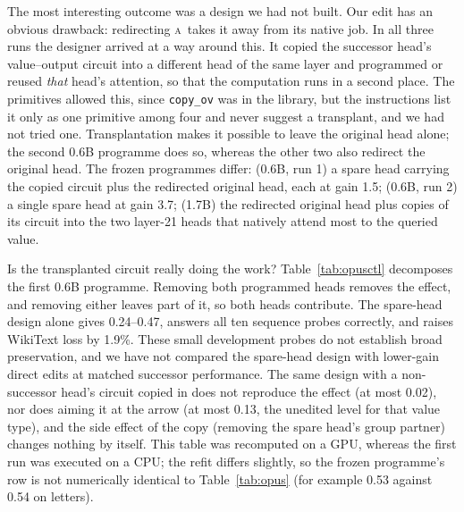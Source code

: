 \documentclass[11pt]{article}
\newcommand{\A}{\textsc{a}}
\begin{document}
The most interesting outcome was a design we had not built. Our edit has an obvious drawback: redirecting \A\ takes it away from its native job. In all three runs the designer arrived at a way around this. It copied the successor head's value--output circuit into a different head of the same layer and programmed or reused \emph{that} head's attention, so that the computation runs in a second place. The primitives allowed this, since \texttt{copy\_ov} was in the library, but the instructions list it only as one primitive among four and never suggest a transplant, and we had not tried one. Transplantation makes it possible to leave the original head alone; the second 0.6B programme does so, whereas the other two also redirect the original head. The frozen programmes differ: (0.6B, run 1) a spare head carrying the copied circuit plus the redirected original head, each at gain 1.5; (0.6B, run 2) a single spare head at gain 3.7; (1.7B) the redirected original head plus copies of its circuit into the two layer-21 heads that natively attend most to the queried value.

Is the transplanted circuit really doing the work? Table~\ref{tab:opusctl} decomposes the first 0.6B programme. Removing both programmed heads removes the effect, and removing either leaves part of it, so both heads contribute. The spare-head design alone gives 0.24--0.47, answers all ten sequence probes correctly, and raises WikiText loss by 1.9\%. These small development probes do not establish broad preservation, and we have not compared the spare-head design with lower-gain direct edits at matched successor performance. The same design with a non-successor head's circuit copied in does not reproduce the effect (at most 0.02), nor does aiming it at the arrow (at most 0.13, the unedited level for that value type), and the side effect of the copy (removing the spare head's group partner) changes nothing by itself. This table was recomputed on a GPU, whereas the first run was executed on a CPU; the refit differs slightly, so the frozen programme's row is not numerically identical to Table~\ref{tab:opus} (for example 0.53 against 0.54 on letters).

\begin{table}[t]
\centering\small
\resizebox{\linewidth}{!}{}
\caption{Qwen3-0.6B-Base: decomposition of the first programme designed by Opus (spare head 0 with head 6's value--output circuit, plus the redirected head 6). Successor rates on the confirmation prompts; Seq.\ and WikiText as in Table~\ref{tab:opus}.}
\label{tab:opusctl}
\end{table}
\end{document}
